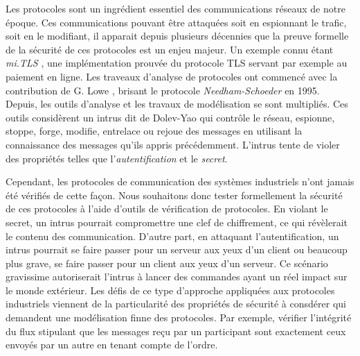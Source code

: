 \documentclass{article}
\begin{document}
Les protocoles sont un ingrédient essentiel des communications réseaux de notre
époque.
Ces communications pouvant être attaquées soit en espionnant le trafic, soit en
le modifiant, il apparait depuis plusieurs décennies que la preuve formelle de
la sécurité de ces protocoles est un enjeu majeur.
Un exemple connu étant {\em mi.TLS} \cite{BFKPS13}, une implémentation prouvée
du protocole TLS \cite{DR08} servant par exemple au paiement en ligne.
Les traveaux d'analyse de protocoles ont commencé avec la contribution de
G. Lowe \cite{Low96}, brisant le protocole {\em Needham-Schoeder} en 1995.
Depuis, les outils d'analyse et les travaux de modélisation se sont multipliés.
Ces outils considèrent un intrus dit de Dolev-Yao \cite{DY81} qui contrôle le
réseau, espionne, stoppe, forge, modifie, entrelace ou rejoue des messages en
utilisant la connaissance des messages qu'ils appris précédemment.
L'intrus tente de violer des propriétés telles que l'{\em autentification}
et le {\em secret}.

Cependant, les protocoles de communication des systèmes industriels n'ont jamais
été vérifiés de cette façon.
Nous souhaitons donc tester formellement la sécurité de ces protocoles à l'aide
d'outils de vérification de protocoles.
En violant le secret, un intrus pourrait compromettre une clef de chiffrement,
ce qui révèlerait le contenu des communication.
D'autre part, en attaquant l'autentification, un intrus pourrait se faire passer
pour un serveur aux yeux d'un client ou beaucoup plus grave, se faire passer
pour un client aux yeux d'un serveur.
Ce scénario gravissime autoriserait l'intrus à lancer des commandes ayant un
réel impact sur le monde extérieur.
Les défis de ce type d'approche appliquées aux protocoles industriels viennent
de la particularité des propriétés de sécurité à consdérer qui demandent une
modélisation finne des protocoles.
Par exemple, vérifier l'intégrité du flux stipulant que les messages reçu par
un participant sont exactement ceux envoyés par un autre en tenant compte de
l'ordre.
\end{document}

